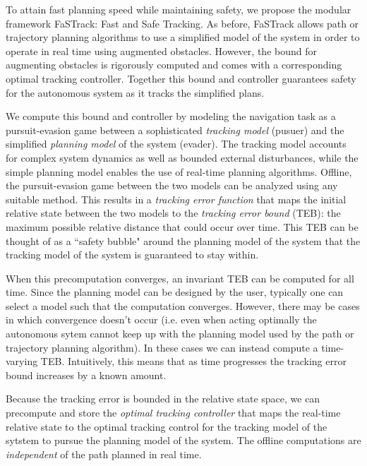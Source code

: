 
To attain fast planning speed while maintaining safety, we propose the modular framework FaSTrack: Fast and Safe Tracking.  As before, FaSTrack allows path or trajectory planning algorithms to use a simplified model of the system in order to operate in real time using augmented obstacles.  However, the bound for augmenting obstacles is rigorously computed and comes with a corresponding optimal tracking controller. Together this bound and controller guarantees safety for the autonomous system as it tracks the simplified plans.

We compute this bound and controller by modeling the navigation task as a pursuit-evasion game between a sophisticated \textit{tracking model} (pusuer) and the simplified \textit{planning model} of the system (evader). 
The tracking model accounts for complex system dynamics as well as bounded external disturbances, while the simple planning model enables the use of real-time planning algorithms. 
Offline, the pursuit-evasion game between the two models can be analyzed using any suitable method. 
This results in a \textit{tracking error function} that maps the initial relative state between the two models to the \textit{tracking error bound} (TEB): the maximum possible relative distance that could occur over time. 
This TEB can be thought of as a ``safety bubble" around the planning model of the system that the tracking model of the system is guaranteed to stay within.

When this precomputation converges, an invariant TEB can be computed for all time.  Since the planning model can be designed by the user, typically one can select a model such that the computation converges.  However, there may be cases in which convergence doesn't occur (i.e. even when acting optimally the autonomous sytem cannot keep up with the planning model used by the path or trajectory planning algorithm).  In these cases we can instead compute a time-varying TEB.  Intuitively, this means that as time progresses the tracking error bound increases by a known amount.

Because the tracking error is bounded in the relative state space, we can precompute and store the \textit{optimal tracking controller} that  maps the real-time relative state to the optimal tracking control for the tracking model of the sytstem to pursue the planning model of the system. 
The offline computations are \textit{independent} of the path planned in real time.

